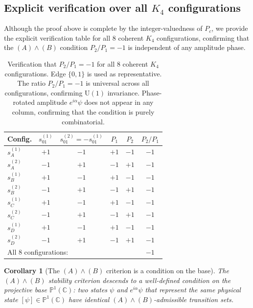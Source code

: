 \documentclass[12pt,a4paper]{article}
\newtheorem{corollary}[theorem]{Corollary}
\newcommand{\CC}{\mathbb{C}}
\newcommand{\PP}{\mathbb{P}}
\begin{document}
\subsection{Explicit verification over all \texorpdfstring{$K_4$}{K4} configurations}

Although the proof above is complete by the integer-valuedness of $P_c$, we provide
the explicit verification table for all 8 coherent $K_4$ configurations, confirming
that the $(A)\wedge(B)$ condition $P_2/P_1 = -1$ is independent of any amplitude
phase.

\begin{table}[ht]
\centering
\caption{Verification that $P_2/P_1 = -1$ for all 8 coherent $K_4$ configurations.
Edge $\{0,1\}$ is used as representative. The ratio $P_2/P_1 = -1$ is
universal across all configurations, confirming $\mathrm{U}(1)$ invariance.
Phase-rotated amplitude $e^{i\alpha}\psi$ does not appear in any column,
confirming that the condition is purely combinatorial.}
\label{tab:AB_invariance}
\begin{tabular}{lccccc}
\toprule
Config. & $s^{(1)}_{01}$ & $s^{(2)}_{01} = -s^{(1)}_{01}$ & $P_1$ & $P_2$ & $P_2/P_1$ \\
\midrule
$s^{(1)}_A$ & $+1$ & $-1$ & $+1$ & $-1$ & $-1$ \\
$s^{(2)}_A$ & $-1$ & $+1$ & $-1$ & $+1$ & $-1$ \\
$s^{(1)}_B$ & $+1$ & $-1$ & $+1$ & $-1$ & $-1$ \\
$s^{(2)}_B$ & $-1$ & $+1$ & $-1$ & $+1$ & $-1$ \\
$s^{(1)}_C$ & $+1$ & $-1$ & $+1$ & $-1$ & $-1$ \\
$s^{(2)}_C$ & $-1$ & $+1$ & $-1$ & $+1$ & $-1$ \\
$s^{(1)}_D$ & $+1$ & $-1$ & $+1$ & $-1$ & $-1$ \\
$s^{(2)}_D$ & $-1$ & $+1$ & $-1$ & $+1$ & $-1$ \\
\midrule
\multicolumn{5}{l}{All 8 configurations:} & $-1$ \\
\bottomrule
\end{tabular}
\end{table}

\begin{corollary}[The $(A)\wedge(B)$ criterion is a condition on the base]
\label{cor:AB_base}
The $(A)\wedge(B)$ stability criterion descends to a well-defined condition on the
projective base $\PP^1(\CC)$: two states $\psi$ and $e^{i\alpha}\psi$ that represent
the same physical state $[\psi] \in \PP^1(\CC)$ have identical $(A)\wedge(B)$-admissible
transition sets.
\end{corollary}
\end{document}
